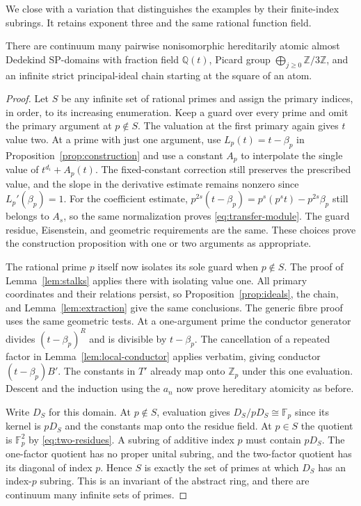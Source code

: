 We close with a variation that distinguishes the examples by their finite-index subrings.
It retains exponent three and the same rational function field.

\begin{corollary}
    \label{cor:variation}
    There are continuum many pairwise nonisomorphic hereditarily atomic almost Dedekind SP-domains with fraction field $\mathbb{Q}(t)$, Picard group $\bigoplus_{j \ge 0} \mathbb{Z}/3\mathbb{Z}$, and an infinite strict principal-ideal chain starting at the square of an atom.
\end{corollary}

\begin{proof}
    Let $S$ be any infinite set of rational primes and assign the primary indices, in order, to its increasing enumeration.
    Keep a guard over every prime and omit the primary argument at $p \notin S$.
    The valuation at the first primary again gives $t$ value two.
    At a prime with just one argument, use $L_p(t) = t - \beta_p$ in Proposition~\ref{prop:construction} and use a constant $A_p$ to interpolate the single value of $t^{d_i} + A_p(t)$.
    The fixed-constant correction still preserves the prescribed value, and the slope in the derivative estimate remains nonzero since $L_p'(\beta_p) = 1$.
    For the coefficient estimate, $p^{2s}(t - \beta_p) = p^s(p^s t) - p^{2s}\beta_p$ still belongs to $A_s$, so the same normalization proves \eqref{eq:transfer-module}.
    The guard residue, Eisenstein, and geometric requirements are the same.
    These choices prove the construction proposition with one or two arguments as appropriate.

    The rational prime $p$ itself now isolates its sole guard when $p \notin S$.
    The proof of Lemma~\ref{lem:stalks} applies there with isolating value one.
    All primary coordinates and their relations persist, so Proposition~\ref{prop:ideals}, the chain, and Lemma~\ref{lem:extraction} give the same conclusions.
    The generic fibre proof uses the same geometric tests.
    At a one-argument prime the conductor generator divides $(t - \beta_p)^R$ and is divisible by $t - \beta_p$.
    The cancellation of a repeated factor in Lemma~\ref{lem:local-conductor} applies verbatim, giving conductor $(t - \beta_p)B'$.
    The constants in $T'$ already map onto $\mathbb{Z}_p$ under this one evaluation.
    Descent and the induction using the $a_n$ now prove hereditary atomicity as before.

    Write $D_S$ for this domain.
    At $p \notin S$, evaluation gives $D_S/pD_S \cong \mathbb{F}_p$ since its kernel is $pD_S$ and the constants map onto the residue field.
    At $p \in S$ the quotient is $\mathbb{F}_p^2$ by \eqref{eq:two-residues}.
    A subring of additive index $p$ must contain $pD_S$.
    The one-factor quotient has no proper unital subring, and the two-factor quotient has its diagonal of index $p$.
    Hence $S$ is exactly the set of primes at which $D_S$ has an index-$p$ subring.
    This is an invariant of the abstract ring, and there are continuum many infinite sets of primes.
\end{proof}
